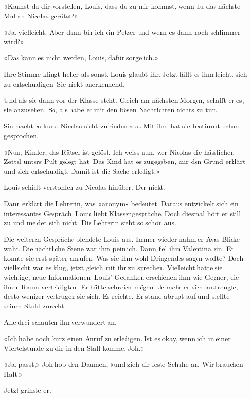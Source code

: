 {«Kannst du dir vorstellen, Louis, dass du zu mir kommst, wenn du das
nächste Mal an Nicolas gerätst?»

«Ja, vielleicht. Aber dann bin ich ein Petzer und wenn es dann noch
schlimmer wird?»

«Das kann es nicht werden, Louis, dafür sorge ich.»

Ihre Stimme klingt heller als sonst. Louis glaubt ihr. Jetzt fällt es
ihm leicht, sich zu entschuldigen. Sie nickt anerkennend.

Und als sie dann vor der Klasse steht. Gleich am nächsten Morgen,
schafft er es, sie anzusehen. So, als habe er mit den bösen Nachrichten
nichts zu tun.

Sie macht es kurz. Nicolas sieht zufrieden aus. Mit ihm hat sie bestimmt
schon gesprochen.

«Nun, Kinder, das Rätsel ist gelöst. Ich weiss nun, wer Nicolas die
hässlichen Zettel unters Pult gelegt hat. Das Kind hat es zugegeben, mir
den Grund erklärt und sich entschuldigt. Damit ist die Sache erledigt.»

Louis schielt verstohlen zu Nicolas hinüber. Der nickt.

Dann erklärt die Lehrerin, was «anonym» bedeutet. Daraus entwickelt sich
ein interessantes Gespräch. Louis liebt Klassengespräche. Doch diesmal
hört er still zu und meldet sich nicht. Die Lehrerin sieht so schön aus.}

\sectionbreak

Die weiteren Gespräche blendete Louis aus. Immer wieder nahm er Avas Blicke wahr. Die nächtliche
Szene war ihm peinlich. Dann fiel ihm Valentina ein. Er
konnte sie erst später anrufen. Was sie ihm wohl Dringendes sagen
wollte? Doch vielleicht war es klug, jetzt gleich mit ihr zu sprechen.
Vielleicht hatte sie wichtige, neue Informationen. Louis’ Gedanken
erschienen ihm wie Gegner, die ihren Raum verteidigten. Er hätte schreien mögen. Je mehr er sich anstrengte, 
desto weniger vertrugen sie sich. Es reichte. Er stand abrupt auf und stellte seinen Stuhl zurecht.

Alle drei schauten ihn verwundert an.

«Ich habe noch kurz einen Anruf zu erledigen. Ist es okay, wenn ich in
einer Viertelstunde zu dir in den Stall komme, Joh.»

«Ja, passt,» Joh hob den Daumen, «und zieh dir feste Schuhe an. Wir
brauchen Halt.»

Jetzt grinste er.

\sectionbreak


